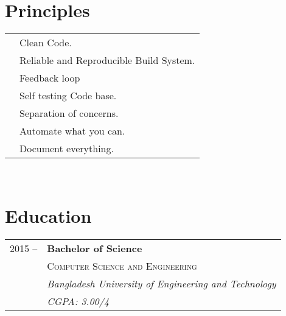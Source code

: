 \documentclass[10pt]{article} %
\begin{document}
{\begin{minipage}[t]{0.44\textwidth}
%
\section{Principles} 

\begin{tabular}{rl}
	\textsc{}
	& Clean Code. \\
	& Reliable and Reproducible Build System.\\
	& Feedback loop \\
	& Self testing Code base.\\
	& Separation of concerns. \\
	& Automate what you can. \\
	& Document everything. \\
\end{tabular}\\[10pt]



\section{Education} 

\begin{tabular}{rl} %


2015 --  & \textbf{Bachelor of Science} \\ 
& \textsc{Computer Science and Engineering} \\ 
& \textit{Bangladesh University of Engineering and Technology}\\
& \textit{CGPA: 3.00/4}\\
	 


\end{tabular}\\[10pt]



\end{minipage}}
\end{document}
